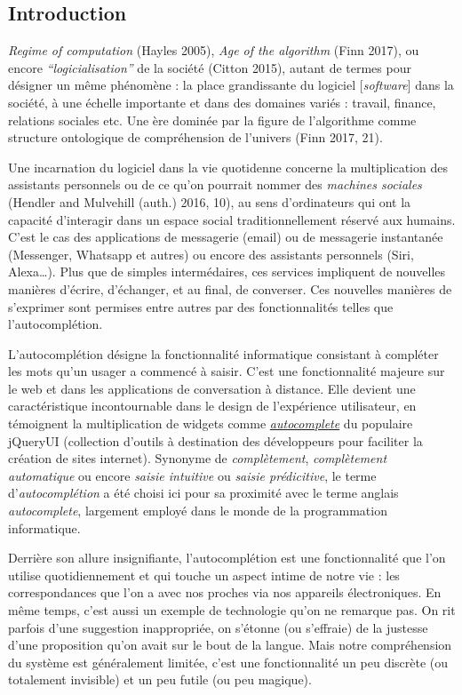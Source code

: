 \documentclass[]{article}
\begin{document}
\newpage

\hypertarget{introduction}{%
\subsection{Introduction}\label{introduction}}

\emph{Regime of computation} (Hayles 2005), \emph{Age of the algorithm}
(Finn 2017), ou encore \emph{``logicialisation''} de la société (Citton
2015), autant de termes pour désigner un même phénomène : la place
grandissante du logiciel {[}\emph{software}{]} dans la société, à une
échelle importante et dans des domaines variés : travail, finance,
relations sociales etc. Une ère dominée par la figure de l'algorithme
comme structure ontologique de compréhension de l'univers (Finn 2017,
21).

Une incarnation du logiciel dans la vie quotidenne concerne la
multiplication des assistants personnels ou de ce qu'on pourrait nommer
des \emph{machines sociales} (Hendler and Mulvehill (auth.) 2016, 10),
au sens d'ordinateurs qui ont la capacité d'interagir dans un espace
social traditionnellement réservé aux humains. C'est le cas des
applications de messagerie (email) ou de messagerie instantanée
(Messenger, Whatsapp et autres) ou encore des assistants personnels
(Siri, Alexa\ldots{}). Plus que de simples intermédaires, ces services
impliquent de nouvelles manières d'écrire, d'échanger, et au final, de
converser. Ces nouvelles manières de s'exprimer sont permises entre
autres par des fonctionnalités telles que l'autocomplétion.

L'autocomplétion désigne la fonctionnalité informatique consistant à
compléter les mots qu'un usager a commencé à saisir. C'est une
fonctionnalité majeure sur le web et dans les applications de
conversation à distance. Elle devient une caractéristique incontournable
dans le design de l'expérience utilisateur, en témoignent la
multiplication de widgets comme
\href{http://jqueryui.com/}{\emph{autocomplete}} du populaire jQueryUI
(collection d'outils à destination des développeurs pour faciliter la
création de sites internet). Synonyme de \emph{complètement},
\emph{complètement automatique} ou encore \emph{saisie intuitive} ou
\emph{saisie prédicitive}, le terme d'\emph{autocomplétion} a été choisi
ici pour sa proximité avec le terme anglais \emph{autocomplete},
largement employé dans le monde de la programmation informatique.

Derrière son allure insignifiante, l'autocomplétion est une
fonctionnalité que l'on utilise quotidiennement et qui touche un aspect
intime de notre vie : les correspondances que l'on a avec nos proches
via nos appareils électroniques. En même temps, c'est aussi un exemple
de technologie qu'on ne remarque pas. On rit parfois d'une suggestion
inappropriée, on s'étonne (ou s'effraie) de la justesse d'une
proposition qu'on avait sur le bout de la langue. Mais notre
compréhension du système est généralement limitée, c'est une
fonctionnalité un peu discrète (ou totalement invisible) et un peu
futile (ou peu magique).
\end{document}
